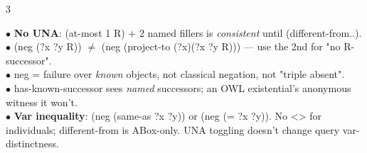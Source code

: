 \documentclass[9pt]{extarticle}
\newcommand{\sect}[1]{\vspace{2pt}{\color{hdr}\footnotesize\bfseries #1}\par\vspace{-3pt}{\color{hdr!40}\rule{\linewidth}{0.6pt}}\par\vspace{1pt}}
\newcommand{\code}[1]{{\ttfamily #1}}   %
\begin{document}
\begin{multicols}{3}
\sect{\color{acc}Gotchas}
{\scriptsize
$\bullet$ \textbf{No UNA}: \code{(at-most 1 R)} + 2 named fillers is \emph{consistent} until \code{(different-from..)}.\\
$\bullet$ \code{(neg (?x ?y R))} $\ne$ \code{(neg (project-to (?x)(?x ?y R)))} --- use the 2nd for "no R-successor".\\
$\bullet$ \code{neg} = failure over \emph{known} objects, not classical negation, not "triple absent".\\
$\bullet$ \code{has-known-successor} sees \emph{named} successors; an OWL existential's anonymous witness it won't.\\
$\bullet$ \textbf{Var inequality}: \code{(neg (same-as ?x ?y))} or \code{(neg (= ?x ?y))}. No \code{<>} for individuals; \code{different-from} is ABox-only. UNA toggling doesn't change query var-distinctness.}

\end{multicols}
\end{document}
